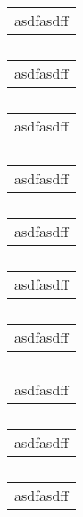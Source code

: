 \begin{table}
	\begin{tabular}{|l|}
		\hline
		asdfasdff
	\end{tabular}
	\caption[bla]{}
\end{table}
\begin{table}
	\begin{tabular}{|l|}
		\hline
		asdfasdff
	\end{tabular}
	\caption[bla]{}
\end{table}
\begin{table}
	\begin{tabular}{|l|}
		\hline
		asdfasdff
	\end{tabular}
	\caption[bla]{}
\end{table}
\begin{table}
	\begin{tabular}{|l|}
		\hline
		asdfasdff
	\end{tabular}
	\caption[bla]{}
\end{table}
\begin{table}
	\begin{tabular}{|l|}
		\hline
		asdfasdff
	\end{tabular}
	\caption[bla]{}
\end{table}
\begin{table}
	\begin{tabular}{|l|}
		\hline
		asdfasdff
	\end{tabular}
	\caption[bla]{}
\end{table}
\begin{table}
	\begin{tabular}{|l|}
		\hline
		asdfasdff
	\end{tabular}
	\caption[bla]{}
\end{table}
\begin{table}
	\begin{tabular}{|l|}
		\hline
		asdfasdff
	\end{tabular}
	\caption[bla]{}
\end{table}
\begin{table}
	\begin{tabular}{|l|}
		\hline
		asdfasdff
	\end{tabular}
	\caption[bla]{}
\end{table}
\begin{table}
	\begin{tabular}{|l|}
		\hline
		asdfasdff
	\end{tabular}
	\caption[bla]{}
\end{table}
